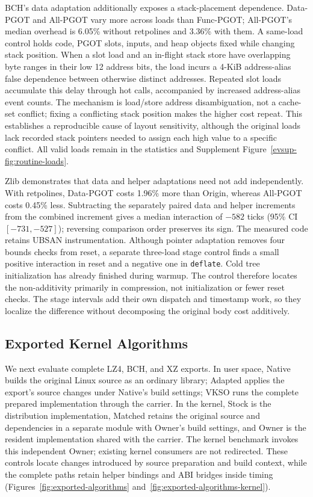 BCH's data adaptation additionally exposes a stack-placement dependence.
Data-PGOT and All-PGOT vary more across loads than Func-PGOT; All-PGOT's
median overhead is 6.05\% without retpolines and 3.36\% with them.
A same-load control holds code, PGOT slots, inputs, and heap objects
fixed while changing stack position. When a slot load and an in-flight
stack store have overlapping byte ranges in their low 12 address bits,
the load incurs a 4-KiB address-alias false dependence between otherwise
distinct addresses. Repeated slot
loads accumulate this delay through hot calls, accompanied by increased
address-alias event counts. The mechanism is
load/store address disambiguation, not a cache-set conflict; fixing a
conflicting stack position makes the higher cost repeat. This establishes
a reproducible cause of layout sensitivity, although the original loads
lack recorded stack pointers needed to assign each high value to a
specific conflict. All valid loads remain in the statistics and
Supplement Figure~\ref{evsup-fig:routine-loads}.

Zlib demonstrates that data and helper adaptations need not add
independently. With retpolines, Data-PGOT costs 1.96\% more than Origin,
whereas All-PGOT costs 0.45\% less. Subtracting the separately paired
data and helper increments from the combined increment gives a median
interaction of $-582$ ticks (95\% CI $[-731,-527]$); reversing comparison
order preserves its sign. The measured code retains UBSAN
instrumentation. Although pointer adaptation removes four bounds checks
from reset, a separate three-load stage control finds a small positive
interaction in reset and a negative one in \texttt{deflate}. Cold tree
initialization has already finished during warmup. The control therefore
locates the non-additivity primarily in compression, not initialization
or fewer reset checks. The stage intervals add their own dispatch and
timestamp work, so they localize the difference without decomposing the
original body cost additively.

\subsection{Exported Kernel Algorithms}
\label{sec:exported-algorithms}

We next evaluate complete LZ4, BCH, and XZ exports. In user space,
Native builds the original Linux source as an ordinary library; Adapted
applies the export's source changes under Native's build settings; VKSO
runs the complete prepared implementation through the carrier. In the
kernel, Stock is the distribution implementation, Matched retains the
original source and dependencies in a separate module with Owner's
build settings, and Owner is the resident implementation shared with
the carrier. The kernel benchmark invokes this independent Owner;
existing kernel consumers are not redirected. These controls locate
changes introduced by source preparation and build context, while the
complete paths retain helper bindings and ABI bridges inside timing
(Figures~\ref{fig:exported-algorithms}
and~\ref{fig:exported-algorithms-kernel}).

